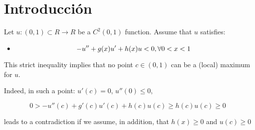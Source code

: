 \section{Introducción}

\begin{lemma}
	Let $u:(0,1) \subset R \rightarrow R$ be a $C^2(0,1)$ function.
	Assume that $u$ satisfies:
	\begin{itemize}
		\item \[-u'' + g(x)u' + h(x)u < 0,\\ \forall 0 < x < 1\]
	\end{itemize}

	This strict inequality implies that no point $c \in (0,1)$ can be a (local) maximum for $u$.
\end{lemma}

Indeed, in such a point: $u'(c) = 0$, $u''(0) \leq 0$,

\[0 > -u''(c) + g'(c)u'(c) + h(c)u(c) \geq h(c)u(c) \geq 0\]

leads to a contradiction if we assume, in addition, that $h(x) \geq 0$ and $u(c) \geq 0$


